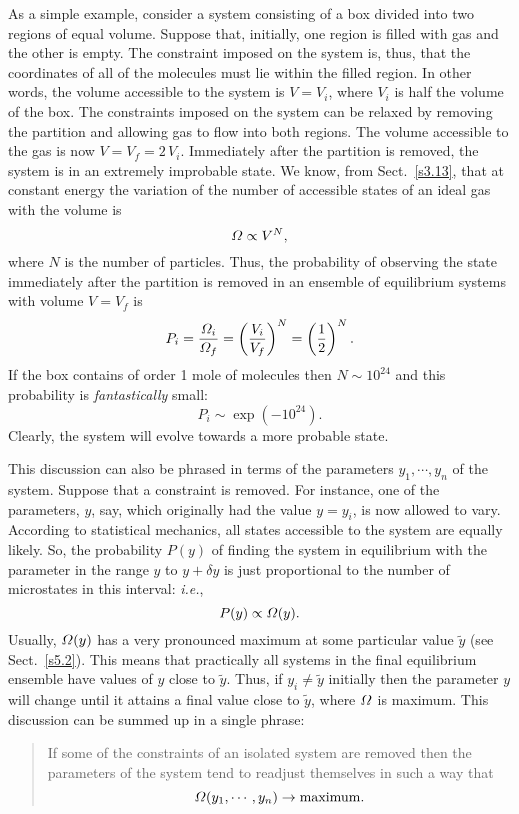 As a simple example, consider a system
consisting of a box divided into two regions of equal volume. Suppose that, 
initially, one region is filled with gas and the other is empty. The constraint
imposed on the system is, thus, that the coordinates of all of the molecules must
lie within the filled region. In other words, the volume accessible to the
system is $V=V_i$, where $V_i$ is half the volume of  the box. The constraints
imposed on the system can be relaxed by removing the partition and allowing gas to
flow into both regions. The volume accessible to the gas is now $V=V_f=2 \,V_i$.
Immediately after the partition is removed, the system is
in an extremely improbable state. 
We know, from Sect.~\ref{s3.13}, that at constant energy the variation of the number
of accessible states of an ideal gas with the volume is
\begin{equation}
{\mit\Omega} \propto V^N,
\end{equation}
where $N$ is the number of particles. Thus, the probability of observing the state
immediately after the partition is removed in an ensemble of equilibrium 
systems  with
volume $V=V_f$ is
\begin{equation}
P_i = \frac{{\mit\Omega}_i}{{\mit\Omega}_f} = \left(\frac{V_i}{V_f}\right)^N =\left(\frac{1}{2}
\right)^N.
\end{equation}
If the box contains of order 1 mole of molecules then $N\sim 10^{24}$ and this
probability is {\em fantastically}\/ small:
\begin{equation}
P_i \sim \exp\left(-10^{24}\right).
\end{equation}
Clearly, the system will evolve towards a more probable state.

This discussion can also be phrased in terms of
the parameters $y_1, \cdots, y_n$ of the system. 
Suppose that a constraint is  removed.
For instance, one of the parameters, $y$, say, which originally had the value
$y=y_i$, is now allowed to vary. According to statistical mechanics, all states
accessible to the system are equally likely. So, the probability $P(y)$
of finding the
system in equilibrium with the parameter
 in the range $y$ to $y+\delta y$ is just proportional
to the number of microstates in this interval: {\em i.e.},
\begin{equation}
P(y) \propto {\mit\Omega}(y).
\end{equation}
Usually, ${\mit\Omega}(y)$ has a very pronounced maximum at some particular
value $\tilde{y}$ 
(see Sect.~\ref{s5.2}). This means that
 practically all systems in  the final equilibrium ensemble
 have values of $y$ close to $\tilde{y}$. Thus, if $y_i\neq \tilde{y}$
initially
then the parameter $y$ will change until it attains a final
value close to $\tilde{y}$,
where ${\mit\Omega}$ is maximum. This discussion can be summed up in a single
phrase:
\begin{quote}
{\sf If some of the constraints of an isolated system are removed then the parameters
of the system tend to readjust themselves in such a way that}
\begin{equation}
{\mit\Omega}(y_1,\cdots, y_n)\rightarrow {\rm maximum}.\label{e5.58}
\end{equation}
\end{quote}

